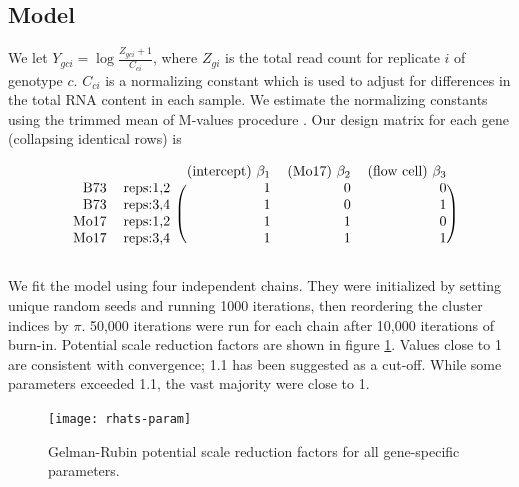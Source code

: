 {\subsection{Model}
We let $Y_{gci} = \log \frac{Z_{gci}+1}{C_{ci}}$, where $Z_{gi}$ is the total read count for replicate $i$ of genotype $c$. $C_{ci}$ is a normalizing constant which is used to adjust for differences in the total RNA content in each sample. We estimate the normalizing constants using the trimmed mean of M-values procedure \cite{robinson2010}. Our design matrix for each gene (collapsing identical rows) is

\begin{equation*}
\begin{blockarray}{rlrrr}
  && \mbox{(intercept) }\beta_1 & \mbox{(Mo17) }\beta_2 & \mbox{(flow cell) }\beta_3\\
  \begin{block}{rl(rrr)}
  \mbox{B73}    &\mbox{reps:1,2} & 1 & 0 & 0\\
  \mbox{B73}    &\mbox{reps:3,4} & 1 & 0 & 1\\
  \mbox{Mo17}   &\mbox{reps:1,2} & 1 & 1 & 0\\
  \mbox{Mo17}   &\mbox{reps:3,4} & 1 & 1 & 1\\
  \end{block}
\end{blockarray}
\label{design}
\end{equation*}

We fit the model using four independent chains. They were initialized by setting unique random seeds and running 1000 iterations, then reordering the cluster indices by $\pi$. 50,000 iterations were run for each chain after 10,000 iterations of burn-in. Potential scale reduction factors are shown in figure \ref{rhat}. Values close to 1 are consistent with convergence; 1.1 has been suggested as a cut-off. While some parameters exceeded 1.1, the vast majority were close to 1.

\begin{figure}
\centering
\texttt{[image: rhats-param]}
\caption{Gelman-Rubin potential scale reduction factors for all gene-specific parameters.}
\label{rhat}
\end{figure}

}
